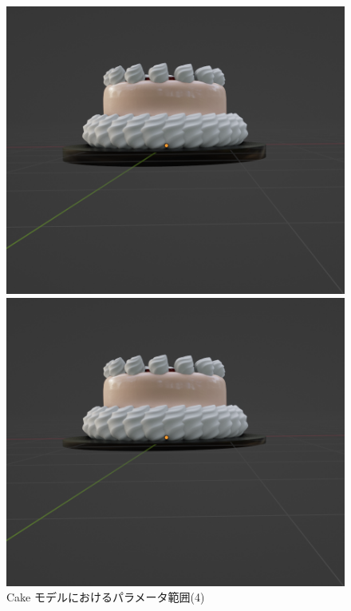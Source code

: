 \begin{figure}[h]
\begin{minipage}[b]{0.48\linewidth}
 \end{minipage}\\
 \begin{minipage}[b]{0.48\linewidth}
  \centering
  \includegraphics[scale=0.25]{./imgs/cakeParamMean/tickMin.png}
 \end{minipage}
 \begin{minipage}[b]{0.48\linewidth}
  \centering
  \includegraphics[scale=0.25]{./imgs/cakeParamMean/tickMax.png}
 \end{minipage}
 \caption{Cake モデルにおけるパラメータ範囲(4)}\label{fig:cakeParamMean_4}
\end{figure}